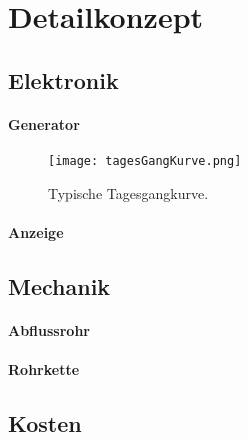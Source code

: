 \section{Detailkonzept} \label{sec:detailkonzept}

\subsection{Elektronik}

\paragraph{Generator}
\begin{figure}[H]
\centering
\texttt{[image: tagesGangKurve.png]}
\caption{Typische Tagesgangkurve. \cite{peakWaterDemand}}
\label{fig:tagesGangKurve}
\end{figure}
\paragraph{Anzeige}

\subsection{Mechanik}

\paragraph{Abflussrohr}

\paragraph{Rohrkette}


\subsection{Kosten}
